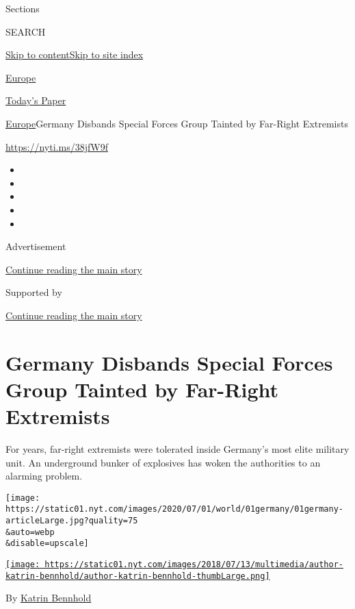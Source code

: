 Sections

SEARCH

\protect\hyperlink{site-content}{Skip to
content}\protect\hyperlink{site-index}{Skip to site index}

\href{https://www.nytimes.com/section/world/europe}{Europe}

\href{https://myaccount.nytimes.com/auth/login?response_type=cookie\&client_id=vi}{}

\href{https://www.nytimes.com/section/todayspaper}{Today's Paper}

\href{/section/world/europe}{Europe}\textbar{}Germany Disbands Special
Forces Group Tainted by Far-Right Extremists

\url{https://nyti.ms/38jfW9f}

\begin{itemize}
\item
\item
\item
\item
\item
\end{itemize}

Advertisement

\protect\hyperlink{after-top}{Continue reading the main story}

Supported by

\protect\hyperlink{after-sponsor}{Continue reading the main story}

\hypertarget{germany-disbands-special-forces-group-tainted-by-far-right-extremists}{%
\section{Germany Disbands Special Forces Group Tainted by Far-Right
Extremists}\label{germany-disbands-special-forces-group-tainted-by-far-right-extremists}}

For years, far-right extremists were tolerated inside Germany's most
elite military unit. An underground bunker of explosives has woken the
authorities to an alarming problem.

\texttt{[image: https://static01.nyt.com/images/2020/07/01/world/01germany/01germany-articleLarge.jpg?quality=75\\\&auto=webp\\\&disable=upscale]}

\href{https://www.nytimes.com/by/katrin-bennhold}{\texttt{[image: https://static01.nyt.com/images/2018/07/13/multimedia/author-katrin-bennhold/author-katrin-bennhold-thumbLarge.png]}}

By \href{https://www.nytimes.com/by/katrin-bennhold}{Katrin Bennhold}

